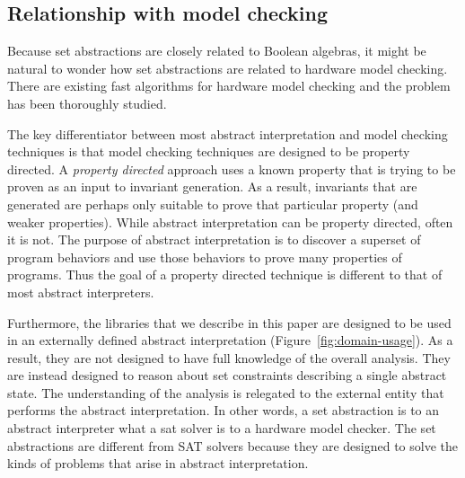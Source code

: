 \subsection{Relationship with model checking}

Because set abstractions are closely related to Boolean algebras, it might be natural to wonder how set abstractions are related to hardware model checking.  There are existing fast algorithms for hardware model checking and the problem has been thoroughly studied.

The key differentiator between most abstract interpretation and model checking techniques is that model checking techniques are designed to be property directed.  A \emph{property directed} approach uses a known property that is trying to be proven as an input to invariant generation.  As a result, invariants that are generated are perhaps only suitable to prove that particular property (and weaker properties).  While abstract interpretation can be property directed, often it is not.  The purpose of abstract interpretation is to discover a superset of program behaviors and use those behaviors to prove many properties of programs.  Thus the goal of a property directed technique is different to that of most abstract interpreters.

Furthermore, the libraries that we describe in this paper are designed to be used in an externally defined abstract interpretation (Figure~\ref{fig:domain-usage}).  As a result, they are not designed to have full knowledge of the overall analysis.  They are instead designed to reason about set constraints describing a single abstract state.  The understanding of the analysis is relegated to the external entity that performs the abstract interpretation.  In other words, a set abstraction is to an abstract interpreter what a sat solver is to a hardware model checker.  The set abstractions are different from SAT solvers because they are designed to solve the kinds of problems that arise in abstract interpretation.

